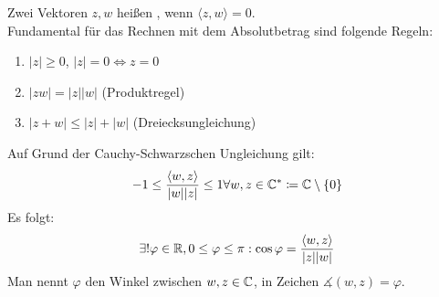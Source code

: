 Zwei Vektoren $ z,w $ hei\ss en , wenn $ \langle z,w\rangle=0 $.\\
Fundamental f\"ur das Rechnen mit dem Absolutbetrag sind folgende Regeln:
\begin{enumerate}
\item $ |z|\geq 0 $, $ |z|=0\Leftrightarrow z=0 $
\item $ |zw|=|z||w| $ (Produktregel)
\item $ |z+w|\leq|z|+|w| $ (Dreiecksungleichung)
\end{enumerate}
Auf Grund der Cauchy-Schwarzschen Ungleichung gilt:
\[ -1\leq\frac{\langle w,z\rangle}{|w||z|}\leq 1\forall w,z\in\mathbb{C}^\ast\coloneqq\mathbb{C}\setminus\lbrace 0\rbrace \]
Es folgt:
\[ \exists!\varphi\in\mathbb{R}, 0\leq\varphi\leq\pi: \cos\varphi=\frac{\langle w,z\rangle}{|z||w|} \]
Man nennt $ \varphi $ den Winkel zwischen $ w,z\in\mathbb{C} $, in Zeichen $ \measuredangle(w,z)=\varphi $. 